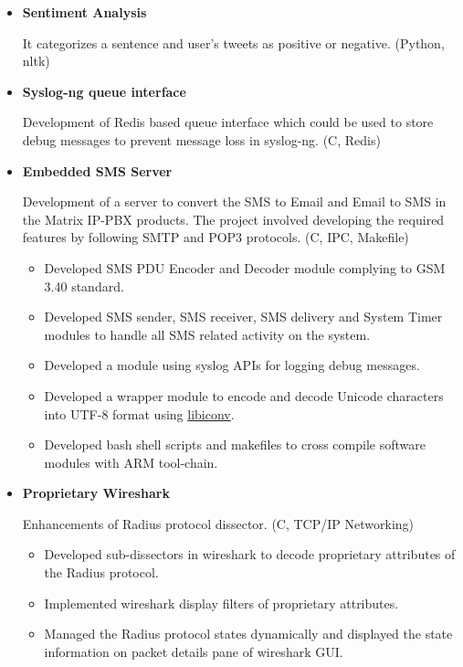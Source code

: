 \documentclass[letterpaper,11pt]{article}
\newcommand{\resitem}[1]{\item #1 \vspace{-2pt}}
\begin{document}
\begin{itemize}
\item
    \textbf{Sentiment Analysis} 
    
    It categorizes a sentence and user's tweets as positive or negative. (Python, nltk)

\item
    \textbf{Syslog-ng queue interface} 
    
    Development of Redis based queue interface which could be used to store debug messages to prevent message loss in syslog-ng. (C, Redis)

\item
    \textbf{Embedded SMS Server}
    
    Development of a server to convert the SMS to Email and Email to SMS in the Matrix IP-PBX products. The project involved developing the required features by following SMTP and POP3 protocols. (C, IPC, Makefile)
    \vspace{-8pt}

	\begin{itemize}
		\resitem{Developed SMS PDU Encoder and Decoder module complying to GSM 3.40 standard.}
		
		\resitem{Developed SMS sender, SMS receiver, SMS delivery and System Timer modules to handle all SMS related activity on the system.}
	  	
	  	\resitem{Developed a module using syslog APIs for logging debug messages.}

	    \resitem{Developed a wrapper module to encode and decode Unicode characters into UTF-8 format using \href{https://github.com/bnoordhuis/libiconv}{libiconv}.}
        
        \resitem{Developed bash shell scripts and makefiles to cross compile software modules with ARM tool-chain.}
		
	\end{itemize}
    
\item
    \textbf{Proprietary Wireshark}
    
    Enhancements of Radius protocol dissector. (C, TCP/IP Networking)
    \vspace{-8pt}

	\begin{itemize}
	    \resitem{Developed sub-dissectors in wireshark to decode proprietary attributes of the Radius protocol.}
	    \resitem{Implemented wireshark display filters of proprietary attributes.}
	    \resitem{Managed the Radius protocol states dynamically and displayed the state information on packet details pane of wireshark GUI.}
	   	\end{itemize}


\end{itemize}
\end{document}
